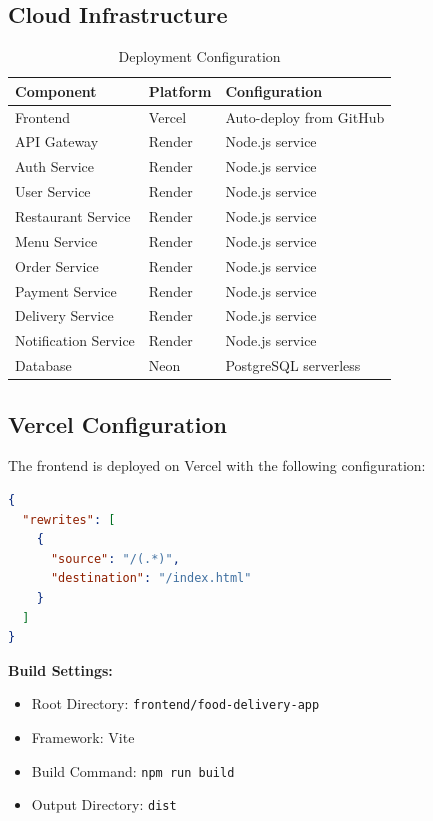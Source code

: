 \documentclass[12pt,a4paper]{article}
\begin{document}
\subsection{Cloud Infrastructure}

\begin{table}[H]
\centering
\begin{tabular}{@{}lll@{}}
\toprule
\textbf{Component} & \textbf{Platform} & \textbf{Configuration} \\ \midrule
Frontend & Vercel & Auto-deploy from GitHub \\
API Gateway & Render & Node.js service \\
Auth Service & Render & Node.js service \\
User Service & Render & Node.js service \\
Restaurant Service & Render & Node.js service \\
Menu Service & Render & Node.js service \\
Order Service & Render & Node.js service \\
Payment Service & Render & Node.js service \\
Delivery Service & Render & Node.js service \\
Notification Service & Render & Node.js service \\
Database & Neon & PostgreSQL serverless \\ \bottomrule
\end{tabular}
\caption{Deployment Configuration}
\end{table}

\subsection{Vercel Configuration}

The frontend is deployed on Vercel with the following configuration:

\begin{lstlisting}[language=JSON, caption=vercel.json]
{
  "rewrites": [
    {
      "source": "/(.*)",
      "destination": "/index.html"
    }
  ]
}
\end{lstlisting}

\textbf{Build Settings:}
\begin{itemize}
    \item Root Directory: \texttt{frontend/food-delivery-app}
    \item Framework: Vite
    \item Build Command: \texttt{npm run build}
    \item Output Directory: \texttt{dist}
\end{itemize}
\end{document}
